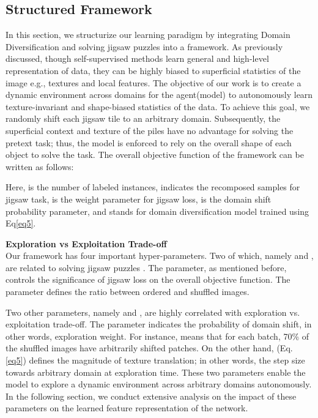 \documentclass[10pt,twocolumn,letterpaper]{article}
\begin{document}
\subsection{Structured Framework}\label{sec_framework}
In this section, we structurize our learning paradigm by integrating Domain Diversification and solving jigsaw puzzles into a framework. As previously discussed, though self-supervised methods learn general and high-level representation of data, they can be highly biased to superficial statistics of the image e.g., textures and local features. The objective of our work is to create a dynamic environment across domains for the agent(model) to autonomously learn texture-invariant and shape-biased statistics of the data.
To achieve this goal, we randomly shift each jigsaw tile to an arbitrary domain. Subsequently, the superficial context and texture of the piles have no advantage for solving the pretext task; thus, the model is enforced to rely on the overall shape of each object to solve the task. The overall objective function of the framework can be written as follows:

Here,  is the number of labeled instances,  indicates the recomposed samples for jigsaw task,  is the weight parameter for jigsaw loss,  is the domain shift probability parameter, and  stands for domain diversification model trained using Eq\ref{eq5}.

\vspace{2mm}
\noindent
\textbf{Exploration vs Exploitation Trade-off}\quad \\
Our framework has four important hyper-parameters. Two of which, namely  and , are related to solving jigsaw puzzles \cite{carlucci2019domain}. The  parameter, as mentioned before, controls the significance of jigsaw loss on the overall objective function. The  parameter defines the ratio between ordered and shuffled images.

Two other parameters, namely  and , are highly correlated with exploration vs. exploitation trade-off.
The  parameter indicates the probability of domain shift, in other words, exploration weight. For instance,  means that for each batch, 70\% of the shuffled images have arbitrarily shifted patches. On the other hand,  (Eq. \ref{eq5}) defines the magnitude of texture translation; in other words, the step size towards arbitrary domain at exploration time.
These two parameters enable the model to explore a dynamic environment across arbitrary domains autonomously.
In the following section, we conduct extensive analysis on the impact of these parameters on the learned feature representation of the network.
\end{document}
